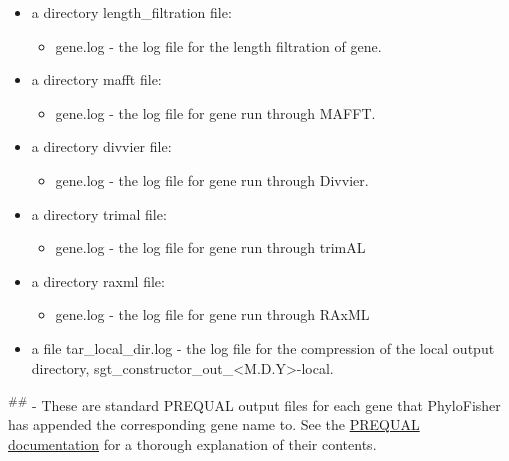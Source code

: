 \documentclass{article}
\begin{document}
\begin{enumerate}[itemsep=12pt]
\begin{description}
\begin{itemize}
\begin{itemize}
\begin{itemize}
                        \end{itemize}
                    \item a directory length\_filtration file:
                    \begin{itemize}
                            \item {gene}.log - the log file for the length filtration of {gene}.
                        \end{itemize}
                    \item a directory mafft file:
                    \begin{itemize}
                            \item {gene}.log - the log file for {gene} run through MAFFT.
                        \end{itemize}
                    \item a directory divvier file:
                    \begin{itemize}
                            \item {gene}.log - the log file for {gene} run through Divvier.
                        \end{itemize}
                    \item a directory trimal file:
                    \begin{itemize}
                            \item {gene}.log - the log file for {gene} run through trimAL
                        \end{itemize}
                    \item a directory raxml file:
                    \begin{itemize}
                            \item {gene}.log - the log file for {gene} run through RAxML
                        \end{itemize}
                    \item a file tar\_local\_dir.log - the log file for the compression of the local output directory, sgt\_constructor\_out\_<M.D.Y>-local.
                \end{itemize}
                

        \end{itemize}
        \vspace{0.2cm}
        \textsuperscript{\#\#} - These are standard PREQUAL output files for each gene that PhyloFisher has appended the corresponding gene name to. See the \href{http://amoeba.msstate.edu/phylofisher/pdfs/prequal.pdf}{PREQUAL documentation} for a thorough explanation of their contents.
        \vspace{0.2cm}
        

\end{description}
\end{enumerate}
\end{document}
